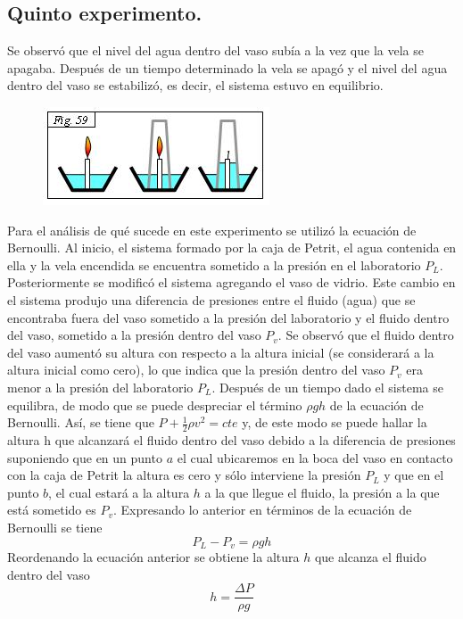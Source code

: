\documentclass[10pt,a4paper]{article}
\begin{document}
\subsection*{Quinto experimento.}
Se observó que el nivel del agua dentro del vaso subía a la vez que la vela se apagaba. 
Después de un tiempo determinado la vela se apagó y el nivel del agua dentro del vaso se estabilizó, es decir, el sistema estuvo en equilibrio.
\begin{figure}[H]
\includegraphics[scale=1.2]{vaso2.JPG}
\centering
\end{figure}


Para el análisis de qué sucede en este experimento se utilizó la ecuación de Bernoulli.
Al inicio, el sistema formado por la caja de Petrit, el agua contenida en ella y la vela encendida se encuentra sometido a la presión en el laboratorio $P_L$. Posteriormente se modificó el sistema agregando el vaso de vidrio. 
Este cambio en el sistema produjo una diferencia de presiones entre el fluido (agua) que se encontraba fuera del vaso sometido a la presión del laboratorio y el fluido dentro del vaso, sometido a la presión dentro del vaso $P_v$. 
Se observó que el fluido dentro del vaso aumentó su altura con respecto a la altura inicial (se considerará a la altura inicial como cero), lo que indica que la presión dentro del vaso $P_v$ era menor a la presión del laboratorio $P_L$.
Después de un tiempo dado el sistema se equilibra, de modo que se puede despreciar el término $\rho g h$ de la ecuación de Bernoulli.
Así, se tiene que $P + \frac{1}{2} \rho v^2 = cte$ y, de este modo se puede hallar la altura h que alcanzará el fluido dentro del vaso debido a la diferencia de presiones suponiendo que en un punto $a$ el cual ubicaremos en la boca del vaso en contacto con la caja de Petrit la altura es cero y sólo interviene la presión $P_L$ y que en el punto $b$, el cual estará a la altura $h$ a la que llegue el fluido, la presión a la que está sometido es $P_v$. Expresando lo anterior en términos de la ecuación de Bernoulli se tiene $$ P_L - P_v = \rho g h $$
Reordenando la ecuación anterior se obtiene la altura $h$ que alcanza el fluido dentro del vaso $$ h= \frac{\Delta P}{\rho g} $$
\end{document}
